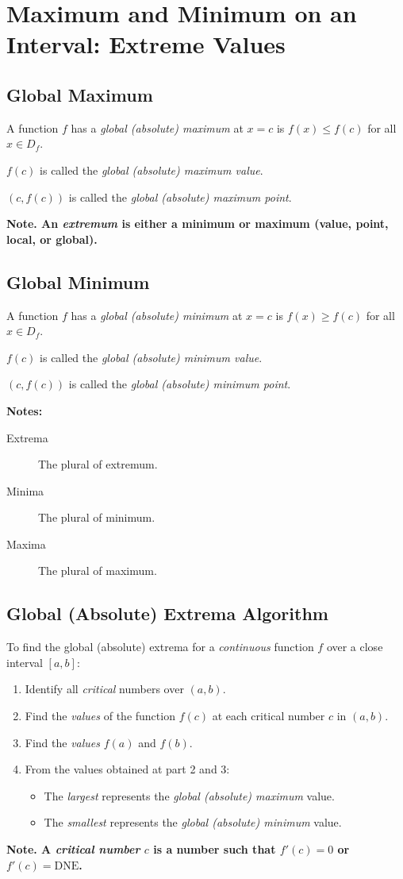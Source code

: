 \section{Maximum and Minimum on an Interval: Extreme Values}
\subsection{Global Maximum}
	A function $f$ has a \emph{global (absolute) maximum} at $x=c$ is $f(x) \leq f(c)$ for all $x \in D_f$.

	$f(c)$ is called the \emph{global (absolute) maximum value}.

	$(c, f(c))$ is called the \emph{global (absolute) maximum point}.

	\textbf{Note. An \emph{extremum} is either a minimum or maximum (value, point, local, or global).}
\subsection{Global Minimum}
	A function $f$ has a \emph{global (absolute) minimum} at $x = c$ is $f(x) \geq f(c)$ for all $x \in D_f$.

	$f(c)$ is called the \emph{global (absolute) minimum value}.

	$(c, f(c))$ is called the \emph{global (absolute) minimum point}.

	\textbf{Notes:}
	\begin{description}
		\item[Extrema] The plural of extremum.
		\item[Minima] The plural of minimum.
		\item[Maxima] The plural of maximum.
	\end{description}
\subsection{Global (Absolute) Extrema Algorithm}
	To find the global (absolute) extrema for a \emph{continuous} function $f$ over a close interval $[a,b]$:
	\begin{enumerate}
		\item Identify all \emph{critical} numbers over $(a,b)$.
		\item Find the \emph{values} of the function $f(c)$ at each critical number $c$ in $(a,b)$.
		\item Find the \emph{values} $f(a)$ and $f(b)$.
		\item From the values obtained at part 2 and 3:
			\begin{itemize}
				\item The \emph{largest} represents the \emph{global (absolute) maximum} value.
				\item The \emph{smallest} represents the \emph{global (absolute) minimum} value.
			\end{itemize}
	\end{enumerate}
	\textbf{Note. A \emph{critical number} $c$ is a number such that $f'(c) = 0$ or $f'(c) = \mathrm{DNE}$.}
